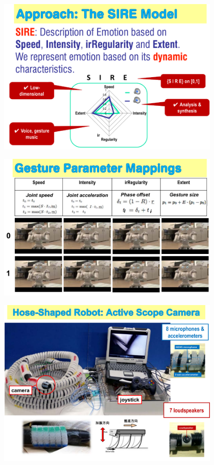 \documentclass[xetex,mathserif,serif]{beamer}
\begin{document}
	\begin{frame}
		\begin{center}
			\includegraphics[width=0.8\textwidth]{okuno20.png}
		\end{center}
	\end{frame}

	\begin{frame}
		\begin{center}
			\includegraphics[width=0.8\textwidth]{okuno21.png}
		\end{center}
	\end{frame}

	\begin{frame}
		\begin{center}
			\includegraphics[width=0.8\textwidth]{okuno22.png}
		\end{center}
	\end{frame}
\end{document}
